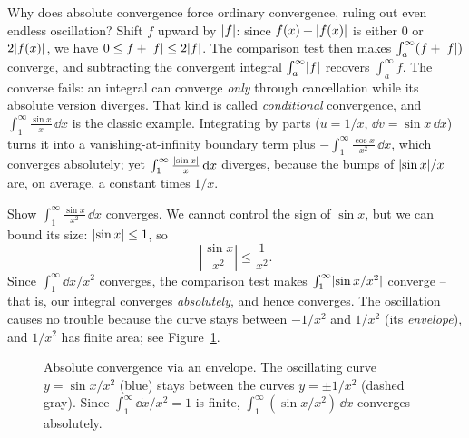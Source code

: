 \begin{intuitionbox}
Why does absolute convergence force ordinary convergence, ruling out even endless
oscillation? Shift $f$ upward by $\lvert f\rvert$: since $f(x) + \lvert f(x)\rvert$ is either $0$ or
$2\lvert f(x)\rvert$, we have $0 \le f + \lvert f\rvert \le 2\lvert f\rvert$. The comparison test then makes
$\int_a^\infty (f + \lvert f\rvert)$ converge, and subtracting the convergent integral
$\int_a^\infty \lvert f\rvert$ recovers $\int_a^\infty f$. The converse fails: an integral can
converge \emph{only} through cancellation while its absolute version diverges. That
kind is called \emph{conditional} convergence, and $\int_1^\infty
\frac{\sin x}{x}\,\dd x$ is the classic example. Integrating by parts
($u = 1/x$, $\dd v = \sin x\,\dd x$) turns it into a vanishing-at-infinity boundary term
plus $-\int_1^\infty \frac{\cos x}{x^2}\,\dd x$, which converges absolutely; yet
$\int_1^\infty \frac{\lvert\sin x\rvert}{x}\,\mathrm{d} x$ diverges, because the bumps of
$\lvert\sin x\rvert/x$ are, on average, a constant times $1/x$.
\end{intuitionbox}

\begin{example}
\label{ch25:ex-abs}
Show $\displaystyle\int_1^{\infty}\frac{\sin x}{x^2}\,\dd x$ converges. We cannot
control the sign of $\sin x$, but we can bound its size: $\lvert\sin x\rvert\le 1$, so
\[
  \left\lvert\frac{\sin x}{x^2}\right\rvert \le \frac{1}{x^2}.
\]
Since $\int_1^\infty \dd x/x^2$ converges, the comparison test makes
$\int_1^\infty \lvert\sin x / x^2\rvert$ converge -- that is, our integral converges
\emph{absolutely}, and hence converges. The oscillation causes no trouble because
the curve stays between $-1/x^2$ and $1/x^2$ (its \emph{envelope}), and $1/x^2$
has finite area; see Figure~\ref{ch25:fig-envelope}.
\end{example}

\begin{figure}[H]
\centering
{}
\caption{Absolute convergence via an envelope. The oscillating curve $y = \sin x/x^2$ (blue) stays between the curves $y=\pm 1/x^2$ (dashed gray). Since $\int_1^\infty \dd x/x^2 = 1$ is finite, $\int_1^\infty (\sin x/x^2)\,\dd x$ converges absolutely.}
\label{ch25:fig-envelope}
\end{figure}


